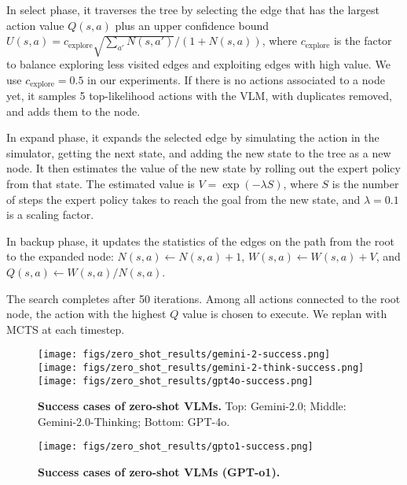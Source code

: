 In select phase, it traverses the tree by selecting the edge that has the largest action value $Q(s, a)$ plus an upper confidence bound $U(s, a)=c_\text{explore}{\sqrt{\sum_{a'} N(s,a')}}/{(1+N(s,a))}$, 
where $c_\text{explore}$ is the factor to balance exploring less visited edges and exploiting edges with high value. We use $c_\text{explore}=0.5$ in our experiments. If there is no actions associated to a node yet, it samples 5 top-likelihood actions with the VLM, with duplicates removed, and adds them to the node. 

In expand phase, it expands the selected edge by simulating the action in the simulator, getting the next state, and adding the new state to the tree as a new node. It then estimates the value of the new state by rolling out the expert policy from that state. The estimated value is $V=\exp(-\lambda S)$, where $S$ is the number of steps the expert policy takes to reach the goal from the new state, and $\lambda=0.1$ is a scaling factor.

In backup phase, it updates the statistics of the edges on the path from the root to the expanded node: $N(s,a)\leftarrow N(s,a)+1$, $W(s,a)\leftarrow W(s,a)+V$, and $Q(s,a)\leftarrow W(s,a)/N(s,a)$.

The search completes after 50 iterations. Among all actions connected to the root node, the action with the highest $Q$ value is chosen to execute. We replan with MCTS at each timestep. 

\begin{figure}
    \centering
    \texttt{[image: figs/zero\_shot\_results/gemini-2-success.png]}
    \\
    \vspace{5mm}
    \texttt{[image: figs/zero\_shot\_results/gemini-2-think-success.png]}
    \\
    \vspace{5mm}
    \texttt{[image: figs/zero\_shot\_results/gpt4o-success.png]}
    \caption{\textbf{Success cases of zero-shot VLMs.} Top: Gemini-2.0; Middle: Gemini-2.0-Thinking; Bottom: GPT-4o.}
    \label{fig:zero_shot_success_part1}
\end{figure}

\begin{figure}
    \centering
    \texttt{[image: figs/zero\_shot\_results/gpto1-success.png]}
    \caption{\textbf{Success cases of zero-shot VLMs (GPT-o1).}}
    \label{fig:zero_shot_success_part2}
\end{figure}

